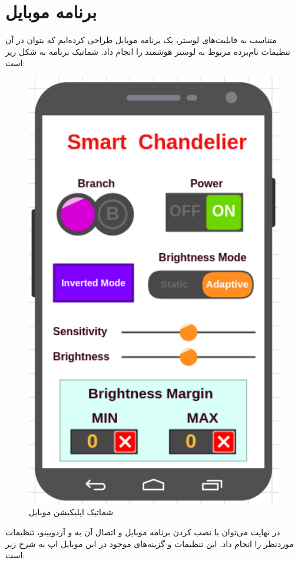 \documentclass[12pt,a4paper]{article}
\begin{document}
	\newpage
\section{برنامه موبایل}
متناسب به قابلیت‌های لوستر، یک برنامه موبایل طراحی کرده‌ایم که بتوان در آن تنظیمات نام‌برده مربوط به لوستر هوشمند را انجام داد. شماتیک برنامه به شکل زیر است:

	\begin{figure}[H]
	\centering
	\includegraphics[scale=0.5]{figs/shcema-ma.png}
	\caption{
		شماتیک اپلیکیشن موبایل
	}
	\label{fig:schema13}
\end{figure}
در نهایت می‌توان با نصب کردن برنامه موبایل و اتصال آن به  و آردویینو، تنظیمات موردنظر را انجام داد. این تنظیمات و گزینه‌های موجود در این موبایل اپ به شرح زیر است:
\end{document}
